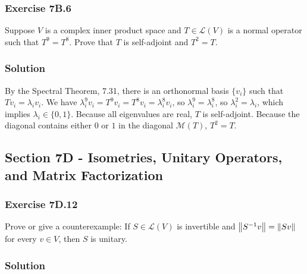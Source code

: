 \subsubsection*{Exercise 7B.6}

Suppose $V$ is a complex inner product space and $T \in \mathcal{L}(V)$ is a normal operator such that $T^9 = T^8$.
Prove that $T$ is self-adjoint and $T^2 = T$.

\subsubsection*{Solution}

By the Spectral Theorem, 7.31, there is an orthonormal basis $\{v_i\}$ such that $Tv_i = \lambda_i v_i$.
We have $\lambda_i^9 v_i = T^9 v_i = T^8 v_i = \lambda_i^8 v_i$, so $\lambda_i^9 = \lambda_i^8$, so $\lambda_i^2 = \lambda_i$, which implies $\lambda_i \in \{0, 1\}$.
Because all eigenvalues are real, $T$ is self-adjoint.
Because the diagonal contains either $0$ or $1$ in the diagonal $\mathcal{M}(T)$, $T^2 = T$.


\subsection*{Section 7D - Isometries, Unitary Operators, and Matrix Factorization}

\subsubsection*{Exercise 7D.12}

Prove or give a counterexample: If $S \in \mathcal{L}(V)$ is invertible and $\left\lVert S^{-1}v\right\rVert = \left\lVert Sv\right\rVert$ for every $v \in V$, then $S$ is unitary.

\subsubsection*{Solution}

